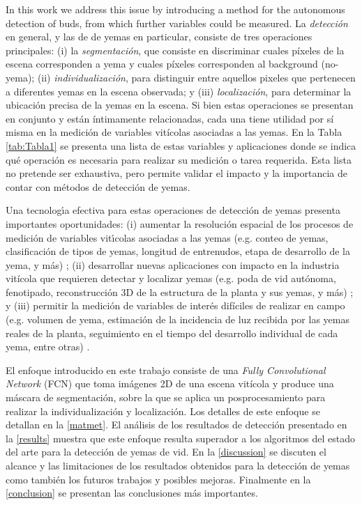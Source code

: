 \documentclass[a4paper,authoryear,review]{elsarticle}
\begin{document}
%
In this work we address this issue by introducing a method for the autonomous detection of buds, from which further variables could be measured. La \emph{detección} en general, y las de de yemas en particular, consiste de tres operaciones principales: (i) la \emph{segmentación}, que consiste en discriminar cuales píxeles de la escena corresponden a yema y cuales píxeles corresponden al background (no-yema); (ii) \emph{individualización}, para distinguir entre aquellos pixeles que pertenecen a diferentes yemas en la escena observada; y (iii) \emph{localización}, para determinar la ubicación precisa de la yemas en la escena. Si bien estas operaciones se presentan en conjunto y están íntimamente relacionadas, cada una tiene utilidad por sí misma en la medición de variables vitícolas asociadas a las yemas. En la Tabla \ref{tab:Tabla1} se presenta una lista de estas variables y aplicaciones donde se indica qué operación es necesaria para realizar su medición o tarea requerida. Esta lista no pretende ser exhaustiva, pero permite validar el impacto y la importancia de contar con métodos de detección de yemas.


Una tecnologı́a efectiva para estas operaciones de detección de yemas presenta importantes oportunidades: (i) aumentar la resolución espacial de los procesos de medición de variables vitı́colas asociadas a las yemas (e.g. conteo de yemas, clasificación de tipos de yemas, longitud de entrenudos, etapa de desarrollo de la yema, y más) \citep{whelan1996spatial, borgogno2018comparison, taylor2019considerations}; (ii) desarrollar nuevas aplicaciones con impacto en la industria vitícola que requieren detectar y localizar yemas (e.g. poda de vid autónoma, fenotipado, reconstrucción 3D de la estructura de la planta y sus yemas, y más) \citep{seng2018computer, taylor2019considerations}; y (iii) permitir la medición de variables de interés difíciles de realizar en campo (e.g. volumen de yema, estimación de la incidencia de luz recibida por las yemas reales de la planta, seguimiento en el tiempo del desarrollo individual de cada yema, entre otras) \citep{collins2020effects}. 

El enfoque introducido en este trabajo consiste de una \emph{Fully Convolutional Network} (FCN) que toma imágenes 2D de una escena vitícola y produce una máscara de segmentación, sobre la que se aplica un posprocesamiento para realizar la individualización y localización. Los detalles de este enfoque se  detallan en la \ref{matmet}. El análisis de los resultados de detección presentado en la \ref{results} muestra que este enfoque resulta superador a los algoritmos del estado del arte para la detección de yemas de vid. En la \ref{discussion} se discuten el alcance y las limitaciones de los resultados obtenidos para la detección de yemas como también los futuros trabajos y posibles mejoras. Finalmente en la \ref{conclusion} se presentan las conclusiones más importantes.
\end{document}
